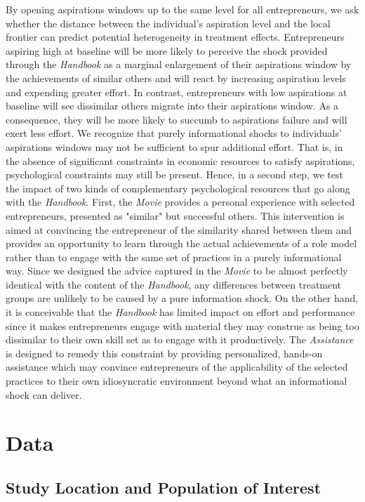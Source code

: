\documentclass[11.5pt]{article}
\begin{document}
By opening aspirations windows up to the same level for all entrepreneurs, we ask whether the distance between the individual's aspiration level and the local frontier can predict potential heterogeneity in treatment effects. Entrepreneurs aspiring high at baseline will be more likely to perceive the shock provided through the \emph{Handbook} as a marginal enlargement of their aspirations window by the achievements of similar others and will react by increasing aspiration levels and expending greater effort. In contrast, entrepreneurs with low aspirations at baseline will see dissimilar others migrate into their aspirations window. As a consequence, they will be more likely to succumb to aspirations failure and will exert less effort. We recognize that purely informational shocks to individuals' aspirations windows may not be sufficient to spur additional effort. That is, in the absence of significant constraints in economic resources to satisfy aspirations, psychological constraints may still be present. Hence, in a second step, we test the impact of two kinds of complementary psychological resources that go along with the \emph{Handbook}. First, the \emph{Movie} provides a personal experience with selected entrepreneurs, presented as "similar" but successful others. This intervention is aimed at convincing the entrepreneur of the similarity shared between them and provides an opportunity to learn through the actual achievements of a role model rather than to engage with the same set of practices in a purely informational way. Since we designed the advice captured in the \emph{Movie} to be almost perfectly identical with the content of the \emph{Handbook}, any differences between treatment groups are unlikely to be caused by a pure information shock. On the other hand, it is conceivable that the \emph{Handbook} has limited impact on effort and performance since it makes entrepreneurs engage with material they may construe as being too dissimilar to their own skill set as to engage with it productively. The \emph{Assistance} is designed to remedy this constraint by providing personalized, hands-on assistance which may convince entrepreneurs of the applicability of the selected practices to their own idiosyncratic environment beyond what an informational shock can deliver.

\section{\textbf{Data}}


\subsection{Study Location and Population of Interest}
\end{document}
